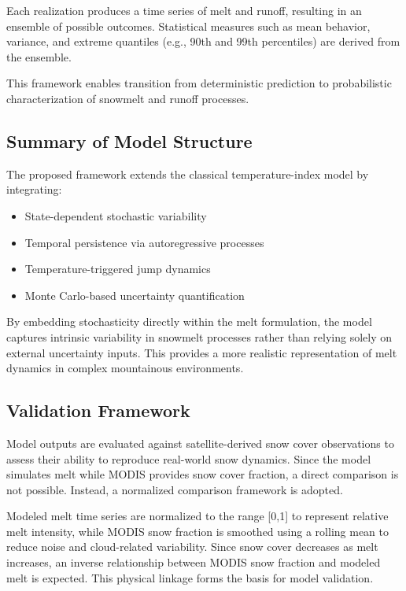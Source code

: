 \documentclass[11pt]{article}
\begin{document}
	Each realization produces a time series of melt and runoff, resulting in an ensemble of possible outcomes. Statistical measures such as mean behavior, variance, and extreme quantiles (e.g., 90th and 99th percentiles) are derived from the ensemble.
	
	This framework enables transition from deterministic prediction to probabilistic characterization of snowmelt and runoff processes.
	
	\subsection{Summary of Model Structure}
	
	The proposed framework extends the classical temperature-index model by integrating:
	
	\begin{itemize}
		\item State-dependent stochastic variability
		\item Temporal persistence via autoregressive processes
		\item Temperature-triggered jump dynamics
		\item Monte Carlo-based uncertainty quantification
	\end{itemize}
	
	By embedding stochasticity directly within the melt formulation, the model captures intrinsic variability in snowmelt processes rather than relying solely on external uncertainty inputs. This provides a more realistic representation of melt dynamics in complex mountainous environments.
	
	\subsection{Validation Framework}
	
	Model outputs are evaluated against satellite-derived snow cover observations to assess their ability to reproduce real-world snow dynamics. Since the model simulates melt while MODIS provides snow cover fraction, a direct comparison is not possible. Instead, a normalized comparison framework is adopted.
	
	Modeled melt time series are normalized to the range [0,1] to represent relative melt intensity, while MODIS snow fraction is smoothed using a rolling mean to reduce noise and cloud-related variability. Since snow cover decreases as melt increases, an inverse relationship between MODIS snow fraction and modeled melt is expected. This physical linkage forms the basis for model validation.
	
\end{document}
